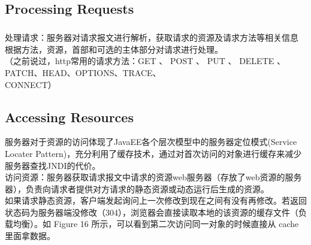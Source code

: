 \documentclass{article}
\begin{document}
	\subsection{Processing Requests}
	\begin{CJK}{UTF8}{gbsn}
		\subparagraph{}
		处理请求：服务器对请求报文进行解析，获取请求的资源及请求方法等相关信息 根据方法，资源，首部和可选的主体部分对请求进行处理。\\
		（之前说过，http常用的请求方法：GET 、 POST 、 PUT 、 DELETE 、 PATCH、HEAD、OPTIONS、TRACE、\\
		CONNECT）
	\end{CJK}{}

	\subsection{Accessing Resources}
	\indent 
	\begin{CJK}{UTF8}{gbsn}
		\indent 服务器对于资源的访问体现了JavaEE各个层次模型中的服务器定位模式(Service Locater Pattern)，充分利用了缓存技术，通过对首次访问的对象进行缓存来减少服务器查找JNDI的代价。\\
		\indent 访问资源：服务器获取请求报文中请求的资源web服务器（存放了web资源的服务器），负责向请求者提供对方请求的静态资源或动态运行后生成的资源。\\
		\indent 如果请求静态资源，客户端发起询问上一次修改到现在之间有没有再修改。若返回状态码为服务器端没修改（304），浏览器会直接读取本地的该资源的缓存文件（负载均衡）。如 Figure 16 所示，可以看到第二次访问同一对象的时候直接从 cache 里面拿数据。
	\end{CJK}{}
\end{document}
